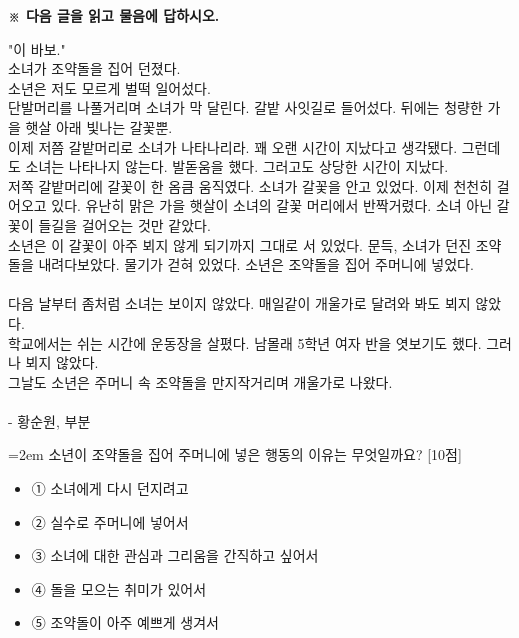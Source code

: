 \documentclass[12pt,a4paper]{article}
\newcommand{\qnum}[1]{%
  \tikz[baseline=(num.base)]{%
    \node[circle, fill=numCircle, text=white, inner sep=0pt,
          minimum size=18pt, font=\small\bfseries] (num) {#1};%
  }%
}
\newcommand{\pts}[1]{%
  \hfill\textcolor{ptsBadge}{[#1점]}%
}
\begin{document}
\vspace{4mm}
{\small\textbf{※ 다음 글을 읽고 물음에 답하시오.}}
\vspace{2mm}
\begin{tcolorbox}[passage]
"이 바보." \\{}
소녀가 조약돌을 집어 던졌다. \\{}
소년은 저도 모르게 벌떡 일어섰다. \\{}
단발머리를 나풀거리며 소녀가 막 달린다. 갈밭 사잇길로 들어섰다. 뒤에는 청량한 가을 햇살 아래 빛나는 갈꽃뿐. \\{}
이제 저쯤 갈밭머리로 소녀가 나타나리라. 꽤 오랜 시간이 지났다고 생각됐다. 그런데도 소녀는 나타나지 않는다. 발돋움을 했다. 그러고도 상당한 시간이 지났다. \\{}
저쪽 갈밭머리에 갈꽃이 한 옴큼 움직였다. 소녀가 갈꽃을 안고 있었다. 이제 천천히 걸어오고 있다. 유난히 맑은 가을 햇살이 소녀의 갈꽃 머리에서 반짝거렸다. 소녀 아닌 갈꽃이 들길을 걸어오는 것만 같았다. \\{}
소년은 이 갈꽃이 아주 뵈지 않게 되기까지 그대로 서 있었다. 문득, 소녀가 던진 조약돌을 내려다보았다. 물기가 걷혀 있었다. 소년은 조약돌을 집어 주머니에 넣었다. \\{}
\vspace{4pt} \\{}
다음 날부터 좀처럼 소녀는 보이지 않았다. 매일같이 개울가로 달려와 봐도 뵈지 않았다. \\{}
학교에서는 쉬는 시간에 운동장을 살폈다. 남몰래 5학년 여자 반을 엿보기도 했다. 그러나 뵈지 않았다. \\{}
그날도 소년은 주머니 속 조약돌을 만지작거리며 개울가로 나왔다. \\{}
\vspace{4pt} \\{}
- 황순원,  부분
\end{tcolorbox}
\vspace{3mm}
\begin{minipage}{\columnwidth}
{\hangindent=2em
\qnum{17}\enspace 소년이 조약돌을 집어 주머니에 넣은 행동의 이유는 무엇일까요? \pts{10}
\par}

\vspace{3mm}
\begin{itemize}[leftmargin=2.5em, labelsep=0.3em, label={}, itemsep=4pt, parsep=1pt, topsep=0pt]
  \item ① 소녀에게 다시 던지려고
  \item ② 실수로 주머니에 넣어서
  \item ③ 소녀에 대한 관심과 그리움을 간직하고 싶어서
  \item ④ 돌을 모으는 취미가 있어서
  \item ⑤ 조약돌이 아주 예쁘게 생겨서
\end{itemize}
\end{minipage}
\vspace{4mm}
\end{document}
